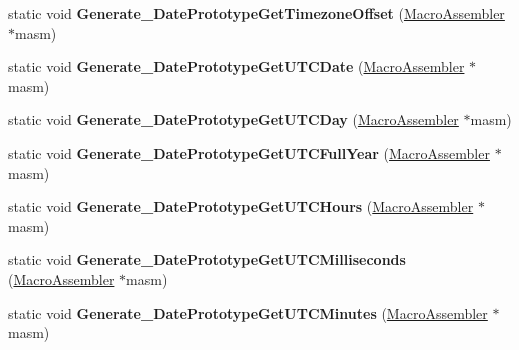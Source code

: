 \begin{DoxyCompactItemize}
\item 
static void {\bfseries Generate\+\_\+\+Date\+Prototype\+Get\+Timezone\+Offset} (\hyperlink{classv8_1_1internal_1_1_macro_assembler}{Macro\+Assembler} $\ast$masm)\hypertarget{classv8_1_1internal_1_1_builtins_a0024c4891521f25df36d5084f85fa8c1}{}\label{classv8_1_1internal_1_1_builtins_a0024c4891521f25df36d5084f85fa8c1}

\item 
static void {\bfseries Generate\+\_\+\+Date\+Prototype\+Get\+U\+T\+C\+Date} (\hyperlink{classv8_1_1internal_1_1_macro_assembler}{Macro\+Assembler} $\ast$masm)\hypertarget{classv8_1_1internal_1_1_builtins_aec3dc23036d9c910adbc98cc81b775cf}{}\label{classv8_1_1internal_1_1_builtins_aec3dc23036d9c910adbc98cc81b775cf}

\item 
static void {\bfseries Generate\+\_\+\+Date\+Prototype\+Get\+U\+T\+C\+Day} (\hyperlink{classv8_1_1internal_1_1_macro_assembler}{Macro\+Assembler} $\ast$masm)\hypertarget{classv8_1_1internal_1_1_builtins_a718f44b2545f9d4301eaa961a6f27e74}{}\label{classv8_1_1internal_1_1_builtins_a718f44b2545f9d4301eaa961a6f27e74}

\item 
static void {\bfseries Generate\+\_\+\+Date\+Prototype\+Get\+U\+T\+C\+Full\+Year} (\hyperlink{classv8_1_1internal_1_1_macro_assembler}{Macro\+Assembler} $\ast$masm)\hypertarget{classv8_1_1internal_1_1_builtins_a0c1f11c5026c708142b4d60a12bfd0f9}{}\label{classv8_1_1internal_1_1_builtins_a0c1f11c5026c708142b4d60a12bfd0f9}

\item 
static void {\bfseries Generate\+\_\+\+Date\+Prototype\+Get\+U\+T\+C\+Hours} (\hyperlink{classv8_1_1internal_1_1_macro_assembler}{Macro\+Assembler} $\ast$masm)\hypertarget{classv8_1_1internal_1_1_builtins_ac9b7f3967c6793dc1dddc63f51a8cffc}{}\label{classv8_1_1internal_1_1_builtins_ac9b7f3967c6793dc1dddc63f51a8cffc}

\item 
static void {\bfseries Generate\+\_\+\+Date\+Prototype\+Get\+U\+T\+C\+Milliseconds} (\hyperlink{classv8_1_1internal_1_1_macro_assembler}{Macro\+Assembler} $\ast$masm)\hypertarget{classv8_1_1internal_1_1_builtins_a5801e0d093fa82a840e6a44cd6367789}{}\label{classv8_1_1internal_1_1_builtins_a5801e0d093fa82a840e6a44cd6367789}

\item 
static void {\bfseries Generate\+\_\+\+Date\+Prototype\+Get\+U\+T\+C\+Minutes} (\hyperlink{classv8_1_1internal_1_1_macro_assembler}{Macro\+Assembler} $\ast$masm)\hypertarget{classv8_1_1internal_1_1_builtins_ac4988cd60c47c2dff5baeaab7e1458e3}{}\label{classv8_1_1internal_1_1_builtins_ac4988cd60c47c2dff5baeaab7e1458e3}


\end{DoxyCompactItemize}
